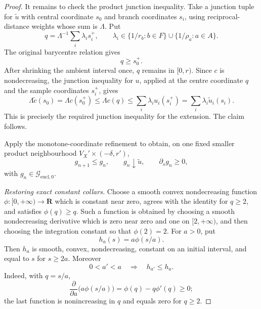 \begin{proof}
It remains to check the product junction inequality.  Take a junction
tuple for $\widetilde u$ with central coordinate $s_0$ and branch
coordinates $s_i$, using reciprocal-distance weights whose sum is
$\Lambda$.  Put
\[
             q=\Lambda^{-1}\sum_i\lambda_i s_i^+,
             \qquad \lambda_i\in
               \{1/r_b:b\in F\}\cup\{1/\rho_a:a\in A\}.
\]
The original barycentre relation gives
\begin{equation}
                         q\geq s_0^+.
\label{eq:p071-star-finite-collar-positive-part-barycentre}
\end{equation}
After shrinking the ambient interval once, $q$ remains in $[0,r)$.
Since $c$ is nondecreasing, the junction inequality for $u$, applied at
the centre coordinate $q$ and the sample coordinates $s_i^+$, gives
\[
 \Lambda\widetilde c(s_0)
   =\Lambda c(s_0^+)
   \leq\Lambda c(q)
   \leq\sum_i\lambda_i u_i(s_i^+)
   =\sum_i\lambda_i\widetilde u_i(s_i).
\]
This is precisely the required junction inequality for the extension.
The claim follows.

Apply the monotone-coordinate refinement to obtain, on one fixed smaller
product neighbourhood $V_X'\times(-\delta,r')$,
\begin{equation}
        g_{n+1}\leq g_n,\qquad g_n\downarrow\widetilde u,
        \qquad \partial_sg_n\geq0,
\label{eq:p071-star-finite-collar-euclidean-approximants}
\end{equation}
with $g_n\in\mathcal G_{\mathrm{eucl},0}$.

\medskip\noindent
\emph{Restoring exact constant collars.}
Choose a smooth convex nondecreasing function
$\phi:[0,+\infty)\to\mathbf R$ which is constant near zero, agrees with
the identity for $q\geq2$, and satisfies $\phi(q)\geq q$.  Such a function
is obtained by choosing a smooth nondecreasing derivative which is zero
near zero and one on $[2,+\infty)$, and then choosing the integration
constant so that $\phi(2)=2$.  For $a>0$, put
\begin{equation}
                         h_a(s)=a\phi(s/a).
\label{eq:p071-star-finite-collar-clamp}
\end{equation}
Then $h_a$ is smooth, convex, nondecreasing, constant on an initial
interval, and equal to $s$ for $s\geq2a$.  Moreover
\begin{equation}
              0<a'<a\quad\Longrightarrow\quad h_{a'}\leq h_a.
\label{eq:p071-star-finite-collar-clamp-order}
\end{equation}
Indeed, with $q=s/a$,
\[
       \frac{\partial}{\partial a}\bigl(a\phi(s/a)\bigr)
          =\phi(q)-q\phi'(q)\geq0;
\]
the last function is nonincreasing in $q$ and equals zero for $q\geq2$.


\end{proof}
